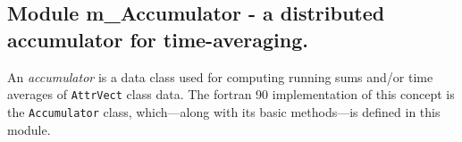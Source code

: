  
\parskip        0pt
\parindent      0pt
\baselineskip  11pt
 
\def\bv{\begin{verbatim}}
\def\ev{\end{verbatim}}
\def\be{\begin{equation}}
\def\ee{\end{equation}}
\def\bea{\begin{eqnarray}}
\def\eea{\end{eqnarray}}
\def\bi{\begin{itemize}}
\def\ei{\end{itemize}}
\def\bn{\begin{enumerate}}
\def\en{\end{enumerate}}
\def\bd{\begin{description}}
\def\ed{\end{description}}
\def\({\left (}
\def\){\right )}
\def\[{\left [}
\def\]{\right ]}
\def\<{\left  \langle}
\def\>{\right \rangle}
\def\cI{{\cal I}}
\def\diag{\mathop{\rm diag}}
\def\tr{\mathop{\rm tr}}
 

 \subsection{Module m\_Accumulator - a distributed accumulator for time-averaging.}


 
 
  An {\em accumulator} is a data class used for computing running sums 
  and/or time averages of {\tt AttrVect} class data.  The fortran 90 
  implementation of this concept is the {\tt Accumulator} class, 
  which---along with its basic methods---is defined in this module.
 
